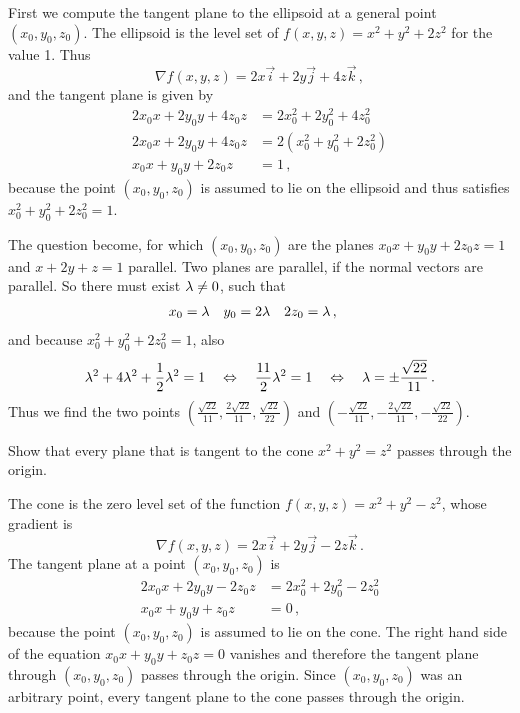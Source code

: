 \begin{solution}
First we compute the tangent plane to the ellipsoid at a general point $(x_0, y_0, z_0)$. The ellipsoid is the level set of $f(x,y,z) = x^2 + y^2 + 2z^2$ for the value 1. Thus
\[
\nabla f(x,y,z) = 2x\vec i + 2y\vec j + 4z\vec k\,,
\]
and the tangent plane is given by
\begin{align*}
2x_0 x + 2y_0 y + 4z_0 z &= 2x_0^2 + 2y_0^2 + 4z_0^2 \\
2x_0 x + 2y_0 y + 4z_0 z &= 2(x_0^2 + y_0^2 + 2z_0^2) \\
x_0 x + y_0 y + 2z_0 z &= 1\,,
\end{align*}
because the point $(x_0,y_0,z_0)$ is assumed to lie on the ellipsoid and thus satisfies $x_0^2 + y_0^2 + 2z_0^2 = 1$.

The question become, for which $(x_0,y_0,z_0)$ are the planes $x_0x + y_0y + 2z_0z = 1$ and $x+2y+z = 1$ parallel. Two planes are parallel, if the normal vectors are parallel. So there must exist $\lambda \neq 0$, such that
\begin{align*}  
x_0 &= \lambda &
y_0 &= 2\lambda &
2z_0 &= \lambda\,,
\end{align*}
and because $x_0^2 + y_0^2 + 2z_0^2 = 1$, also
\[
\lambda^2 + 4\lambda^2 + \frac 12 \lambda^2 = 1
\quad\Leftrightarrow\quad
\frac {11} 2 \lambda^2 = 1
\quad\Leftrightarrow\quad
\lambda = \pm \frac{\sqrt{22}}{11}\,.
\]
Thus we find the two points 
$\left( \frac{\sqrt{22}}{11}, \frac{2\sqrt{22}}{11}, \frac{\sqrt{22}}{22} \right)$
and 
$\left( -\frac{\sqrt{22}}{11}, -\frac{2\sqrt{22}}{11}, -\frac{\sqrt{22}}{22} \right)$.
\end{solution}

\begin{question}
Show that every plane that is tangent to the cone $x^2 + y^2 = z^2$ passes through the origin.
\end{question}

\begin{solution}
The cone is the zero level set of the function $f(x,y,z) = x^2 + y^2 - z^2$, whose gradient is
\[
\nabla f(x,y,z) = 2x\vec i + 2y\vec j - 2z\vec k\,.
\]
The tangent plane at a point $(x_0,y_0,z_0)$ is
\begin{align*}
2x_0x + 2y_0y - 2z_0z &=2x_0^2 + 2y_0^2 - 2z_0^2 \\
x_0 x + y_0 y + z_0z &= 0\,,
\end{align*}
because the point $(x_0,y_0,z_0)$ is assumed to lie on the cone. The right hand side of the equation $x_0 x + y_0 y + z_0z = 0$ vanishes and therefore the tangent plane through $(x_0,y_0,z_0)$ passes through the origin. Since $(x_0,y_0,z_0)$ was an arbitrary point, every tangent plane to the cone passes through the origin.
\end{solution}

